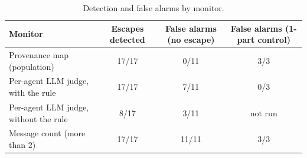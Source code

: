 \begin{table}[t]
\centering
\small
\caption{Detection and false alarms by monitor.}
\label{tab:deteccion}
\begin{tabular}{lccc}
\toprule
  Monitor & Escapes detected & False alarms (no escape) & False alarms (1-part control) \\
\midrule
  Provenance map (population) & 17/17 & 0/11 & 3/3 \\
  Per-agent LLM judge, with the rule & 17/17 & 7/11 & 0/3 \\
  Per-agent LLM judge, without the rule & 8/17 & 3/11 & not run \\
  Message count (more than 2) & 17/17 & 11/11 & 3/3 \\
\bottomrule
\end{tabular}
\end{table}

